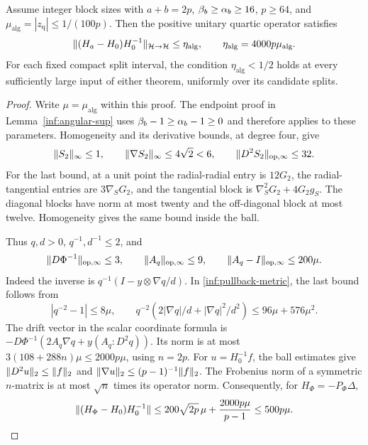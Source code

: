\begin{lemma}
\label{inf:quartic-computable-relative}
Assume integer block sizes with $a+b=2p$, $\beta_b\ge\alpha_b\ge16$,
$p\ge64$, and
$\mu_{\mathrm{alg}}=|z_{\mathrm q}|\le1/(100p)$.
Then the positive unitary quartic operator satisfies
\begin{equation}\label{inf:algorithm-relative-bound}
 \lVert (H_a-H_0)H_0^{-1}\rVert_{\mathcal{H}\to\mathcal{H}}
 \le\eta_{\mathrm{alg}},\qquad
 \eta_{\mathrm{alg}}=4000p\mu_{\mathrm{alg}}.
\end{equation}
For each fixed compact split interval, the condition
$\eta_{\mathrm{alg}}<1/2$ holds at every sufficiently large
input of either theorem, uniformly over its candidate splits.
\end{lemma}
\begin{proof}
Write $\mu=\mu_{\mathrm{alg}}$ within this proof.
The endpoint proof in Lemma~\ref{inf:angular-sup} uses
$\beta_b-1\ge\alpha_b-1\ge0$ and therefore applies to these parameters.
Homogeneity and its derivative bounds, at degree four, give
\[
 \lVert S_2\rVert_\infty\le1,\qquad
 \lVert \nabla S_2\rVert_\infty\le4\sqrt2<6,
 \qquad \lVert D^2S_2\rVert_{\mathrm{op},\infty}\le32.
\]
For the last bound, at a unit point the radial-radial entry is
$12G_2$, the radial-tangential entries are $3\nabla_SG_2$, and
the tangential block is $\nabla_S^2G_2+4G_2g_S$.
The diagonal blocks have norm at most twenty and the off-diagonal
block at most twelve. Homogeneity gives the same bound inside the ball.

Thus $q,d>0$, $q^{-1},d^{-1}\le2$, and
\[
 \lVert D\Phi^{-1}\rVert_{\mathrm{op},\infty}\le3,\qquad
 \lVert A_q\rVert_{\mathrm{op},\infty}\le9,
 \qquad \lVert A_q-I\rVert_{\mathrm{op},\infty}\le200\mu.
\]
Indeed the inverse is $q^{-1}(I-y\otimes\nabla q/d)$.
In \eqref{inf:pullback-metric}, the last bound follows from
\[
 |q^{-2}-1|\le8\mu,\qquad
 q^{-2}\left(2|\nabla q|/d+|\nabla q|^2/d^2\right)
 \le96\mu+576\mu^2.
\]
The drift vector in the scalar coordinate formula is
$-D\Phi^{-1}(2A_q\nabla q+y(A_q:D^2q))$.
Its norm is at most
$3(108+288n)\mu\le2000p\mu$, using $n=2p$.
For $u=H_0^{-1}f$, the ball estimates give
$\lVert D^2u\rVert_2\le\lVert f\rVert_2$ and
$\lVert \nabla u\rVert_2\le(p-1)^{-1}\lVert f\rVert_2$.
The Frobenius norm of a symmetric $n$-matrix is at most $\sqrt n$
times its operator norm. Consequently, for $H_\Phi=-P_\Phi\Delta$,
\begin{equation}\label{inf:algorithm-scalar-bound}
 \lVert (H_\Phi-H_0)H_0^{-1}\rVert
 \le200\sqrt{2p}\,\mu+\frac{2000p\mu}{p-1}
 \le500p\mu.
\end{equation}


\end{proof}
